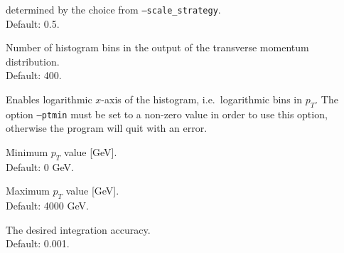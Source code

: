 \documentclass[12pt]{article}
\begin{document}
\begin{description}[labelindent=1cm, labelwidth =\widthof{\bfseries9999999999999999999999}, leftmargin = !]
        determined by the choice from \texttt{--scale\_strategy}. \\
        Default: 0.5.
      \item[\texttt{--nbins <value>}] Number of histogram bins in the
        output of the transverse momentum distribution. \\ Default:
        400.
      \item[\texttt{--log}] Enables logarithmic $x$-axis of the
        histogram, i.e.\ logarithmic bins in $p_{T}$. The option
        \texttt{--ptmin} must be set to a non-zero value in order to
        use this option, otherwise the program will quit with an
        error.
	\item[\texttt{--ptmin <value>}] Minimum $p_{T}$ value [GeV]. \\ Default: 0 GeV. 
	\item[\texttt{--ptmax <value>}] Maximum $p_{T}$ value [GeV]. \\ Default: 4000 GeV. 
	\item[\texttt{--accuracy <value>}] The desired integration accuracy. \\ Default: 0.001. 
\end{description}
\end{document}
